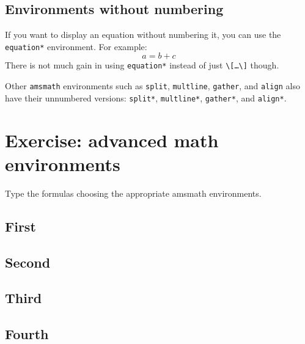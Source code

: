 \subsection{Environments without numbering}
\par If you want to display an equation without numbering it, you can use the \verb"equation*" environment. For example:
\begin{equation*}
    a=b+c
\end{equation*}
There is not much gain in using \verb"equation*" instead of just \verb"\[…\]" though.

Other \verb"amsmath" environments such as \verb"split", \verb"multline", \verb"gather", and \verb"align" also have their unnumbered versions: \verb"split*", \verb"multline*", \verb"gather*", and \verb"align*".

\section{Exercise: advanced math environments}
\begin{staticpart}
Type the formulas choosing the appropriate amsmath environments.
\subsection{First}

\subsection{Second}

\subsection{Third}

\subsection{Fourth}

\end{staticpart}

